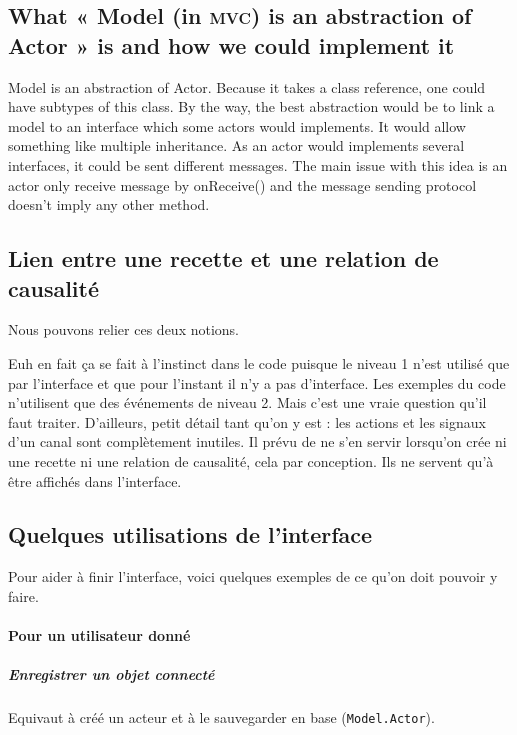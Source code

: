 \documentclass[11pt]{article}
\begin{document}
\subsection{What « Model (in \textsc{mvc}) is an abstraction of Actor » is and how we could implement it}

Model is an abstraction of Actor. Because it takes a class reference, one could have subtypes of this class. By the way, the best abstraction would be to link a model to an interface which some actors would implements. It would allow something like multiple inheritance. As an actor would implements several interfaces, it could be sent different messages. The main issue with this idea is an actor only receive message by onReceive() and the message sending protocol doesn't imply any other method.


\subsection{Lien entre une recette et une relation de causalité}

Nous pouvons relier ces deux notions.

Euh en fait ça se fait à l'instinct dans le code puisque le niveau 1 n'est utilisé que par l'interface et que pour l'instant il n'y a pas d'interface. Les exemples du code n'utilisent que des événements de niveau 2. Mais c'est une vraie question qu'il faut traiter. D'ailleurs, petit détail tant qu'on y est : les actions et les signaux d'un canal sont complètement inutiles. Il prévu de ne s'en servir lorsqu'on crée ni une recette ni une relation de causalité, cela par conception. Ils ne servent qu'à être affichés dans l'interface.

\subsection{Quelques utilisations de l'interface}

Pour aider à finir l'interface, voici quelques exemples de ce qu'on doit pouvoir y faire.

\paragraph{Pour un utilisateur donné}

\subparagraph{Enregistrer un objet connecté} Equivaut à créé un acteur et à le sauvegarder en base (\texttt{Model.Actor}).
\end{document}

